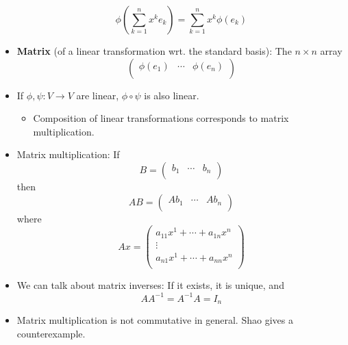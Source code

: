 \documentclass[../notes.tex]{subfiles}
\begin{document}
\begin{itemize}
    \begin{equation*}
        \phi\left( \sum_{k=1}^nx^ke_k \right) = \sum_{k=1}^nx^k\phi(e_k)
    \end{equation*}
    \item \textbf{Matrix} (of a linear transformation wrt. the standard basis): The $n\times n$ array
    \begin{equation*}
        \begin{pmatrix}
            \phi(e_1) & \cdots & \phi(e_n)\\
        \end{pmatrix}
    \end{equation*}
    \item If $\phi,\psi:V\to V$ are linear, $\phi\circ\psi$ is also linear.
    \begin{itemize}
        \item Composition of linear transformations corresponds to matrix multiplication.
    \end{itemize}
    \item Matrix multiplication: If
    \begin{equation*}
        B =
        \begin{pmatrix}
            b_1 & \cdots & b_n\\
        \end{pmatrix}
    \end{equation*}
    then
    \begin{equation*}
        AB =
        \begin{pmatrix}
            Ab_1 & \cdots & Ab_n\\
        \end{pmatrix}
    \end{equation*}
    where
    \begin{equation*}
        Ax =
        \begin{pmatrix}
            a_{11}x^1+\cdots+a_{1n}x^n\\
            \vdots\\
            a_{n1}x^1+\cdots+a_{nn}x^n\\
        \end{pmatrix}
    \end{equation*}
    \item We can talk about matrix inverses: If it exists, it is unique, and
    \begin{equation*}
        AA^{-1} = A^{-1}A = I_n
    \end{equation*}
    \item Matrix multiplication is not commutative in general. Shao gives a counterexample.

\end{itemize}
\end{document}
